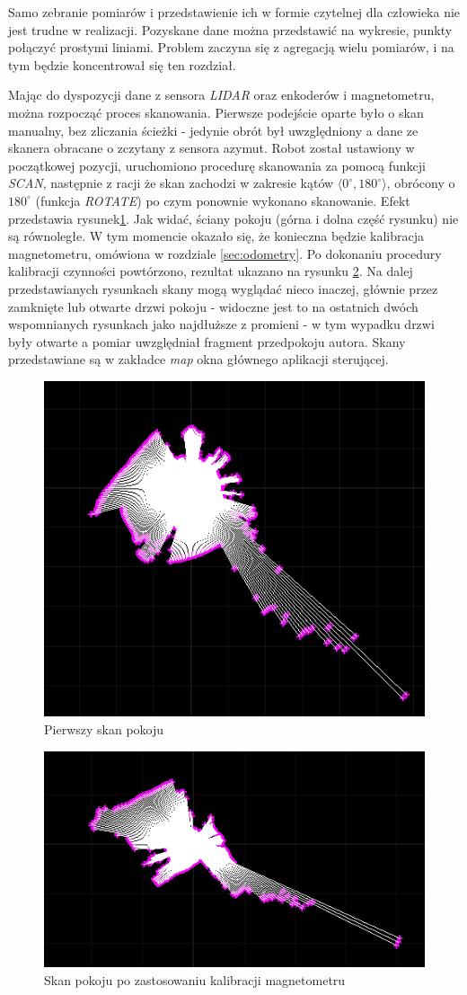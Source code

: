 Samo zebranie pomiarów i przedstawienie ich w formie czytelnej dla człowieka nie jest trudne w realizacji. Pozyskane dane można przedstawić na wykresie, punkty połączyć prostymi liniami. Problem zaczyna się z agregacją wielu pomiarów, i na tym będzie koncentrował się ten rozdział.

Mając do dyspozycji dane z sensora \emph{LIDAR} oraz enkoderów i magnetometru, można rozpocząć proces skanowania. Pierwsze podejście oparte było o skan manualny, bez zliczania ścieżki - jedynie obrót był uwzględniony a dane ze skanera obracane o zczytany z sensora azymut. Robot został ustawiony w początkowej pozycji, uruchomiono procedurę skanowania za pomocą funkcji \emph{SCAN}, następnie z racji że skan zachodzi w zakresie kątów $\langle0^{\circ},180^{\circ}\rangle$, obrócony o $180^{\circ}$ (funkcja \emph{ROTATE}) po czym ponownie wykonano skanowanie. Efekt przedstawia rysunek\ref{fig:first-scan}. Jak widać, ściany pokoju (górna i dolna część rysunku) nie są równoległe. W tym momencie okazało się, że konieczna będzie kalibracja magnetometru, omówiona w rozdziale \ref{sec:odometry}. Po dokonaniu procedury kalibracji czynności powtórzono, rezultat ukazano na rysunku \ref{fig:first-magnetom-calibrated-scan}. Na dalej przedstawianych rysunkach skany mogą wyglądać nieco inaczej, głównie przez zamknięte lub otwarte drzwi pokoju - widoczne jest to na ostatnich dwóch wspomnianych rysunkach jako najdłuższe z promieni - w tym wypadku drzwi były otwarte a pomiar uwzględniał fragment przedpokoju autora. Skany przedstawiane są w zakładce \emph{map} okna głównego aplikacji sterującej.

\begin{figure}[ht]
	\centering
		\includegraphics[width=0.5\linewidth]{rys/ScanBot-01-room-map-nocalibration.png}
	\caption{Pierwszy skan pokoju}
	\label{fig:first-scan}
\end{figure}

\begin{figure}[ht]
	\centering
		\includegraphics[width=0.5\linewidth]{rys/ScanBot-02-room-map-calibrated.png}
	\caption{Skan pokoju po zastosowaniu kalibracji magnetometru}
	\label{fig:first-magnetom-calibrated-scan}
\end{figure}

